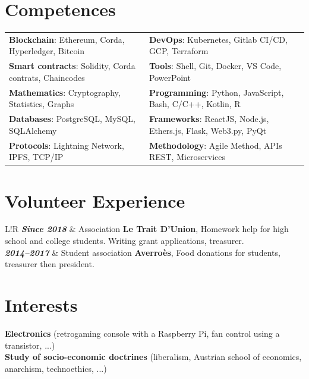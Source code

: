\documentclass[10pt]{article}
\newcommand\VRule{\color{lightgray}\vrule width 2pt}
\begin{document}
\section*{Competences}
\begin{tabular}{ l l }
\textbf{Blockchain}: Ethereum, Corda, Hyperledger, Bitcoin & \textbf{DevOps}: Kubernetes, Gitlab CI/CD, GCP, Terraform \\[0.1cm]
\textbf{Smart contracts}: Solidity, Corda contrats, Chaincodes & \textbf{Tools}: Shell, Git, Docker, VS Code, PowerPoint \\[0.1cm]
\textbf{Mathematics}: Cryptography, Statistics, Graphs & \textbf{Programming}: Python, JavaScript, Bash, C/C++, Kotlin, R \\[0.1cm]
\textbf{Databases}: PostgreSQL, MySQL, SQLAlchemy & \textbf{Frameworks}: ReactJS, Node.js, Ethers.js, Flask, Web3.py, PyQt \\[0.1cm]
\textbf{Protocols}: Lightning Network, IPFS, TCP/IP & \textbf{Methodology}: Agile Method, APIs REST, Microservices \\[0.1cm]
\end{tabular}

\section*{Volunteer Experience}
\begin{tabular}{L!{\VRule}R}
\textbf{\textit{Since 2018}} & Association \textbf{Le Trait D’Union}, Homework help for high school and college students. Writing grant applications, treasurer. \\[0.75cm]

\textbf{\textit{2014--2017}} & Student association \textbf{Averroès}, Food donations for students, treasurer then president. \\
\end{tabular}
\section*{Interests}
\hspace*{1ex} \textbf{Electronics} (retrogaming console with a Raspberry Pi, fan control using a transistor, ...) \\
\hspace*{1ex} \textbf{Study of socio-economic doctrines} (liberalism, Austrian school of economics, anarchism, technoethics, ...) \\
\end{document}
